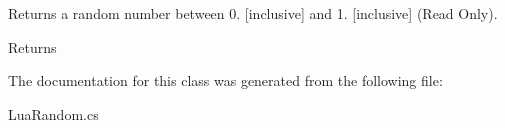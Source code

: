 Returns a random number between 0. \mbox{[}inclusive\mbox{]} and 1. \mbox{[}inclusive\mbox{]} (Read Only). 

\begin{DoxyReturn}{Returns}

\end{DoxyReturn}


The documentation for this class was generated from the following file\+:\begin{DoxyCompactItemize}
\item 
Lua\+Random.\+cs\end{DoxyCompactItemize}
